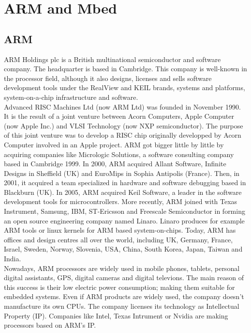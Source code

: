 \documentclass[pdftex,12pt,a4paper]{report}
\begin{document}

\tableofcontents
\chapter{ARM and Mbed}
\section{ARM}
ARM Holdings plc is a British multinational semiconductor and software company. The headquarter is based in Cambridge. This company is well-known in the processor field, although it also designs, licenses and sells software development tools under the RealView and KEIL brands, systems and platforms, system-on-a-chip infrastructure and software. 
\\

Advanced RISC Machines Ltd (now ARM Ltd) was founded in November 1990. It is the result of a joint venture between Acorn Computers, Apple Computer (now Apple Inc.) and VLSI Technology (now NXP semiconductor). The purpose of this joint venture was to develop a RISC chip originally developped by Acorn Computer involved in an Apple project. ARM got bigger little by little by acquiring companies like Micrologic Solutions, a software consulting company based in Cambridge 1999. In 2000, ARM acquired Allant Software, Infinite Designs in Sheffield (UK) and EuroMips in Sophia Antipolis (France). Then, in 2001, it acquired a team specialized in hardware and software debugging based in Blackburn (UK). In 2005, ARM acquired Keil Software, a leader in the software development tools for microcontrollers. More recently, ARM joined with Texas Instrument, Samsung, IBM, ST-Ericsson and Freescale Semiconductor in forming an open source engineering company named Linaro. Linaro produces for example ARM tools or linux kernels for ARM based system-on-chips. Today, ARM has offices and design centres all over the world, including UK, Germany, France, Israel, Sweden, Norway, Slovenia, USA, China, South Korea, Japan, Taiwan and India. 
\\

Nowadays, ARM processors are widely used in mobile phones, tablets, personal digital assistants, GPS, digital cameras and digital televions. The main reason of this success is their low electric power consumption; making them suitable for embedded systems. Even if ARM products are widely used, the company doesn't manufacture its own CPUs. The company licenses its technology as Intellectual Property (IP). Companies like Intel, Texas Intrument or Nvidia are making processors based on ARM's IP.
\end{document}
